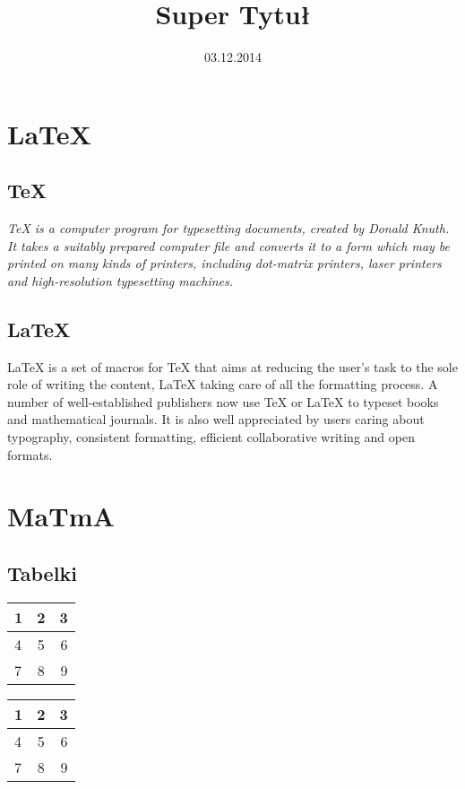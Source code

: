 \documentclass[pdftex,a4paper,10pt]{report}
\author{\color{red}{P.Pośpiech}}
\title{Super Tytuł}
\date{03.12.2014}
\begin{document}


\tableofcontents

\chapter{LaTeX}
\label{cha;chap1}
\section{TeX}
\label{sec;sec1.1}
{\em TeX is a computer program for typesetting documents, created by Donald Knuth. It takes a suitably prepared computer file and converts it to a form which may be printed on many kinds of printers, including dot-matrix printers, laser printers and high-resolution typesetting machines.}\cite{wiki}
\section{LaTeX}
\label{sec;sec1.2}
{\sffamily LaTeX is a set of macros for TeX that aims at reducing the user's task to the sole role of writing the content, LaTeX taking care of all the formatting process. A number of well-established publishers now use TeX or LaTeX to typeset books and mathematical journals. It is also well appreciated by users caring about typography, consistent formatting, efficient collaborative writing and open formats.}\cite{wiki}


\chapter{MaTmA}
\label{cha;chap2}
\section{Tabelki}
\label{sec;sec2.1}
\begin{tabular}{| l | c | r |}
    \hline
    1 & 2 & 3 \\ \hline
    4 & 5 & 6 \\ \hline
    7 & 8 & 9 \\
    \hline
\end{tabular}

\begin{center}
  \begin{tabular}{|| l || c || r ||}
			\hline
			\hline
			1 & 2 & 3 \\ \hline
			4 & 5 & 6 \\ \hline
			7 & 8 & 9 \\
			\hline
			\hline
  \end{tabular}
\end{center}
\end{document}
